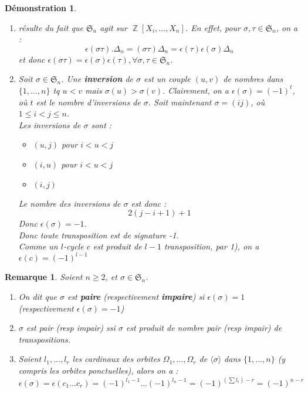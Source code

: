\documentclass[a4paper, oneside]{report}
\theoremstyle{break}
\newtheorem{remar}[thm]{Remarque}
\newtheorem*{demo}{Démonstration}
\DeclareMathOperator{\Z}{\mathbb{Z}}
\renewcommand{\S}{\mathfrak{S}}
\begin{document}
\begin{demo}
	\begin{enumerate}
		\item résulte du fait que $\S_n$ agit sur $\Z[X_i,...,X_n]$. En effet, pour $\sigma,\tau\in \S_n$, on a :
		$$\epsilon(\sigma\tau).\Delta_n=(\sigma\tau)\Delta_n=\epsilon(\tau)\epsilon(\sigma)\Delta_n$$
		et donc $\epsilon(\sigma\tau)=\epsilon(\sigma)\epsilon(\tau),\forall \sigma,\tau \in \S_n$.
		
		\item Soit $\sigma\in \S_n$. Une \textbf{inversion} de $\sigma$ est un couple $(u,v)$ de nombres dans $\{1,...,n\}$ tq $u<v$ mais $\sigma(u)>\sigma(v)$. Clairement, on a $\epsilon(\sigma)=(-1)^t$, où $t$ est le nombre d'inversions de $\sigma$. Soit maintenant $\sigma=(ij)$, où $1\leq i < j \leq n$.\\
		Les inversions de $\sigma$ sont :
		\begin{itemize}
			\item $(u,j)$ pour $i<u<j$
			\item $(i,u)$ pour $i<u<j$
			\item $(i,j)$
		\end{itemize}
		Le nombre des inversions de $\sigma$ est donc :
		$$2(j-i+1)+1$$
		Donc $\epsilon(\sigma)=-1$.\\
		Donc toute transposition est de signature -1.\\
		Comme un $l$-cycle $c$ est produit de $l-1$ transposition, par 1), on a $\epsilon(c)=(-1)^{l-1}$
	\end{enumerate}
\end{demo}

\begin{remar}
	Soient $n\geq 2$, et $\sigma\in \S_n$.
	\begin{enumerate}
		\item On dit que $\sigma$ est \textbf{paire} (respectivement \textbf{impaire}) si $\epsilon(\sigma)=1$ (respectivement $\epsilon(\sigma)=-1$)
		\item $\sigma$ est pair (resp impair) ssi $\sigma$ est produit de nombre pair (resp impair) de transpositions.
		\item Soient $l_1,...,l_r$ les cardinaux des orbites $\Omega_1,...,\Omega_r$ de $\langle \sigma\rangle$ dans $\{1,...,n\}$ (y compris les orbites ponctuelles), alors on a :
		$$\epsilon(\sigma)=\epsilon(c_1...c_r)=(-1)^{l_1-1}...(-1)^{l_n-1}=(-1)^{(\sum l_i)-r}=(-1)^{n-r}$$
	\end{enumerate}
\end{remar}
\end{document}
